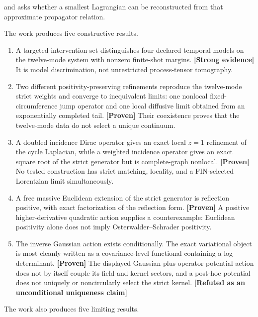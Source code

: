 \documentclass[11pt,a4paper,openany]{report}
\newcommand{\statusProven}{\textcolor{fingreen}{[Proven]}}
\newcommand{\statusStrong}{\textcolor{finblue}{[Strong evidence]}}
\begin{document}
and asks whether a smallest Lagrangian can be reconstructed from that approximate propagator relation.

The work produces five constructive results.

\begin{enumerate}
\item 
A targeted intervention set distinguishes four declared temporal models on the twelve-mode system with nonzero finite-shot margins. \textbf{\statusStrong{}} It is model discrimination, not unrestricted process-tensor tomography.

\item 
Two different positivity-preserving refinements reproduce the twelve-mode strict weights and converge to inequivalent limits: one nonlocal fixed-circumference jump operator and one local diffusive limit obtained from an exponentially completed tail. \textbf{\statusProven{}} Their coexistence proves that the twelve-mode data do not select a unique continuum.

\item 
A doubled incidence Dirac operator gives an exact local \(z=1\) refinement of the cycle Laplacian, while a weighted incidence operator gives an exact square root of the strict generator but is complete-graph nonlocal. \textbf{\statusProven{}} No tested construction has strict matching, locality, and a FIN-selected Lorentzian limit simultaneously.

\item 
A free massive Euclidean extension of the strict generator is reflection positive, with exact factorization of the reflection form. \textbf{\statusProven{}} A positive higher-derivative quadratic action supplies a counterexample: Euclidean positivity alone does not imply Osterwalder–Schrader positivity.

\item 
The inverse Gaussian action exists conditionally. The exact variational object is most cleanly written as a covariance-level functional containing a log determinant. \textbf{\statusProven{}} The displayed Gaussian-plus-operator-potential action does not by itself couple its field and kernel sectors, and a post-hoc potential does not uniquely or noncircularly select the strict kernel. \textbf{[Refuted as an unconditional uniqueness claim]}

\end{enumerate}

The work also produces five limiting results.
\end{document}
